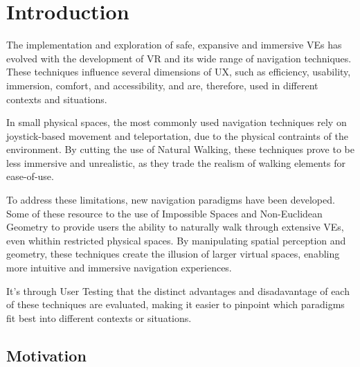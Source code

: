 
%

\chapter{Introduction}     
\label{cha:introduction}


\epigraphfontsize{\small\itshape}
\setlength\epigraphwidth{12.5cm}
\setlength\epigraphrule{0pt}

The implementation and exploration of safe, expansive and immersive \glspl{VE} has evolved with the development of \gls{VR} and its wide range of navigation techniques. These techniques influence several dimensions of \gls{UX}, such as efficiency, usability, immersion, comfort, and accessibility, and are, therefore, used in different contexts and situations.

In small physical spaces, the most commonly used navigation techniques rely on joystick-based movement and teleportation, due to the physical contraints of the environment. By cutting the use of Natural Walking, these techniques prove to be less immersive and unrealistic, as they trade the realism of walking elements for ease-of-use.

To address these limitations, new navigation paradigms have been developed. Some of these resource to the use of Impossible Spaces and Non-Euclidean Geometry to provide users the ability to naturally walk through extensive \glspl{VE}, even whithin restricted physical spaces. By manipulating spatial perception and geometry, these techniques create the illusion of larger virtual spaces, enabling more intuitive and immersive navigation experiences.

It's through User Testing that the distinct advantages and disadavantage of each of these techniques are evaluated, making it easier to pinpoint which paradigms fit best into different contexts or situations.

\section{Motivation}

